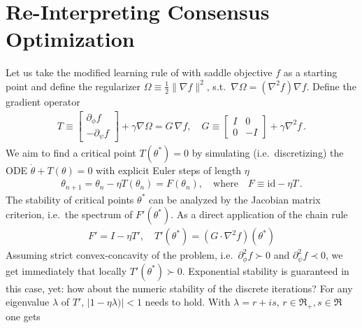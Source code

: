 \documentclass{article}
\newtheorem{comment}{Comment}
\begin{document}
\section{Re-Interpreting Consensus Optimization}
Let us take the modified learning rule of \cite{mescheder2017numerics} with saddle objective $f$ as a starting point and define the regularizer $\Omega \equiv \frac 12 \| \nabla f\|^2$, s.t.~$\nabla \Omega = (\nabla^2 f) \nabla f$. Define the gradient operator
\begin{align}
T \equiv \begin{bmatrix} \partial_\phi f \\ - \partial_\psi f \end{bmatrix} + \gamma \nabla\Omega
= G \, \nabla f, \quad G \equiv \begin{bmatrix} I & 0 \\ 0 & - I \end{bmatrix} + \gamma \nabla^2 f \,.
\end{align}
We aim to find a critical point $T(\theta^*)=0$ by simulating (i.e.~discretizing) the ODE $\dot \theta + T(\theta) =0$ with explicit Euler steps of length $\eta$
\begin{align}
\theta_{n+1} = \theta_n - \eta T(\theta_n) = F(\theta_n), \quad \text{where} \quad F \equiv \text{id} - \eta T \,.
\end{align}
The stability of critical points $\theta^*$ can be analyzed by the Jacobian matrix criterion, i.e.~the spectrum of $F'(\theta^*)$. As a direct application of the chain rule
\begin{align}
F' = I - \eta T', \quad T'(\theta^*) = (G \cdot \nabla^2 f)(\theta^*)
\label{eq:T'}
\end{align}
Assuming strict convex-concavity of the problem, i.e.~$\partial^2_\phi f \succ 0$ and $\partial^2_\psi f \prec 0$, we get immediately that locally $T'(\theta^*) \succ 0$.
Exponential stability is guaranteed in this case, yet: how about the numeric stability of the discrete iterations?  For any eigenvalue $\lambda$  of $T'$, $|1 - \eta \lambda)| <1$ needs to hold. With $\lambda = r + is$, $r \in \Re_+, s\in \Re$ one gets
\end{document}
